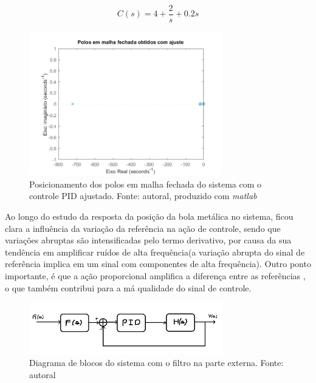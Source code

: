 \documentclass{ifacconf}
\begin{document}
\begin{equation}
  C(s) = 4 + \frac{2}{s} + 0.2s
  \label{equa: controle ajustado}
\end{equation}

\begin{figure}[!htb]
  \begin{center}
  \includegraphics[width=8.4cm]{figures/lei pid ajuste.jpg}    %
  \caption{Posicionamento dos polos em malha fechada do sistema com o controle PID ajustado. Fonte: autoral, produzido com \textit{matlab}} 
  \label{fig:pid_ajustado}
  \end{center}
\end{figure}

Ao longo do estudo da resposta da posição da bola metálica no sistema, ficou clara a influência da variação da referência na ação de controle, sendo que variações abruptas são 
intensificadas pelo termo derivativo, por causa da sua tendência em amplificar ruídos de alta frequência(a variação abrupta do sinal de referência implica em um sinal com componentes 
de alta frequência). Outro ponto importante, é que a ação proporcional amplifica a diferença entre as referências , o que também contribui para a má qualidade do sinal de controle.

\begin{figure}[!htb]
  \begin{center}
  \includegraphics[width=8.4cm]{figures/Diagrama filtro.png}    %
  \caption{Diagrama de blocos do sistema com o filtro na parte externa. Fonte: autoral} 
  \label{fig:diagrama_filtro}
  \end{center}
\end{figure}
\end{document}
